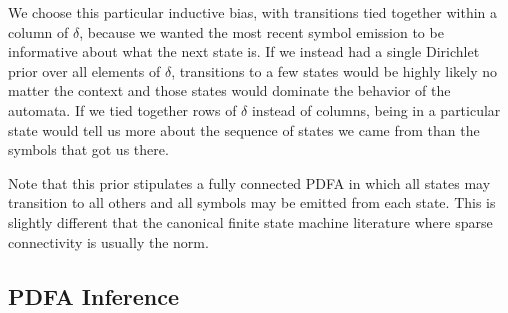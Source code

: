 %
We choose this particular inductive bias, with transitions tied together within a column of $\delta$, because we wanted the most recent symbol emission to be informative about what the next state is.  If we instead had a single Dirichlet prior over all elements of $\delta$, transitions to a few states would be highly likely no matter the context and those states would dominate the behavior of the automata.  If we tied together rows of $\delta$ instead of columns, being in a particular state would tell us more about the sequence of states we came from than the symbols that got us there.  

 Note that this prior stipulates a fully connected PDFA in which all states may transition to all others and all symbols may be emitted from each state.  This is slightly different that the canonical finite state machine literature where sparse connectivity is usually the norm.

\subsection{PDFA Inference}

